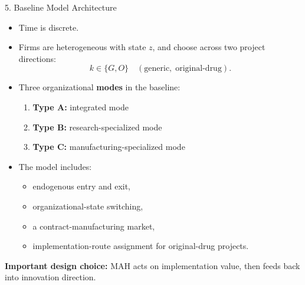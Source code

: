 \documentclass[aspectratio=169,11pt]{beamer}
\begin{document}
\begin{frame}{5. Baseline Model Architecture}
\begin{itemize}
    \item Time is discrete.
    \item Firms are heterogeneous with state \(z\), and choose across two project directions:
    \[
    k\in\{G,O\}\quad (\text{generic},\;\text{original-drug}).
    \]
    \item Three organizational \textbf{modes} in the baseline:
    \begin{enumerate}
        \item \textbf{Type A:} integrated mode
        \item \textbf{Type B:} research-specialized mode
        \item \textbf{Type C:} manufacturing-specialized mode
    \end{enumerate}
    \item The model includes:
    \begin{itemize}
        \item endogenous entry and exit,
        \item organizational-state switching,
        \item a contract-manufacturing market,
        \item implementation-route assignment for original-drug projects.
    \end{itemize}
\end{itemize}

\vspace{0.25cm}
\textbf{Important design choice:} MAH acts on implementation value, then feeds back into innovation direction.
\end{frame}
\end{document}
